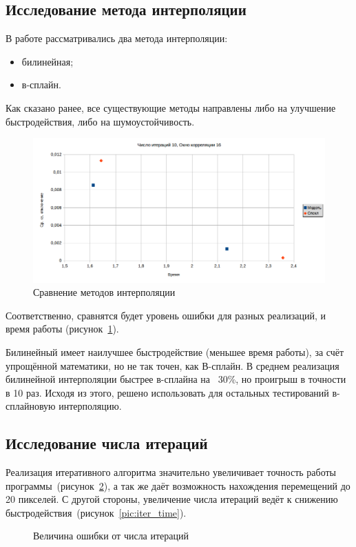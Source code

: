 \subsection{Исследование метода интерполяции}
В работе рассматривались два метода интерполяции:
\begin{itemize}
\item билинейная;
\item в-сплайн.
\end{itemize}
Как сказано ранее, все существующие методы направлены либо на улучшение быстродействия, либо на шумоустойчивость. 
\begin{figure}
\centering
\includegraphics[width=0.8\linewidth]{images/srav_iterpol.png}
\caption{Сравнение методов интерполяции}
\label{fig:srav_iterpol}
\end{figure}
Соответственно, сравнятся будет уровень ошибки для разных реализаций, и время работы (рисунок~\ref{fig:srav_iterpol}).

Билинейный имеет наилучшее быстродействие (меньшее время работы), за счёт упрощённой математики, но не так точен, как В-сплайн. В среднем реализация билинейной интерполяции быстрее в-сплайна на ~30\%, но проигрыш в точности в 10 раз. Исходя из этого, решено использовать для остальных тестирований в-сплайновую интерполяцию. 
\subsection{Исследование числа итераций}

Реализация итеративного алгоритма значительно увеличивает точность работы программы~(рисунок~\ref{pic:inter_err}), а так же даёт возможность нахождения перемещений до 20 пикселей. С другой стороны, увеличение числа итераций ведёт к снижению быстродействия~(рисунок~\ref{pic:iter_time}).
\begin{figure}[h!]
\caption{Величина ошибки от числа итераций}
\label{pic:inter_err}
\end{figure}

